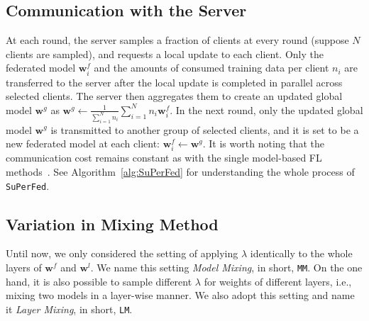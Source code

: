 \documentclass[sigconf]{acmart}
\begin{document}
\subsection{Communication with the Server} At each round, the server samples a fraction of clients at every round (suppose $N$ clients are sampled), and requests a local update to each client. Only the federated model $\textbf{w}_i^{f}$ and the amounts of consumed training data per client $n_i$ are transferred to the server after the local update is completed in parallel across selected clients. The server then aggregates them to create an updated global model $\mathbf{w}^g$ as $\mathbf{w}^{g}\leftarrow\frac{1}{\sum_{i=1}^{N}{n_i}}\sum_{i=1}^{N}{n_i}\mathbf{w}_i^{f}$.
In the next round, only the updated global model $\mathbf{w}^g$ is transmitted to another group of selected clients, and it is set to be a new federated model at each client: $\mathbf{w}_i^f\leftarrow\mathbf{w}^g$. It is worth noting that the communication cost remains constant as with the single model-based FL methods~\cite{mc+17, fedprox}. See Algorithm~\ref{alg:SuPerFed} for understanding the whole process of \texttt{SuPerFed}.

\subsection{Variation in Mixing Method} Until now, we only considered the setting of applying $\lambda$ identically to the whole layers of $\mathbf{w}^f$ and $\mathbf{w}^l$. We name this setting \textit{Model Mixing}, in short, \texttt{MM}. On the one hand, it is also possible to sample different $\lambda$ for weights of different layers, i.e., mixing two models in a layer-wise manner. We also adopt this setting and name it \textit{Layer Mixing}, in short, \texttt{LM}. 
\end{document}
